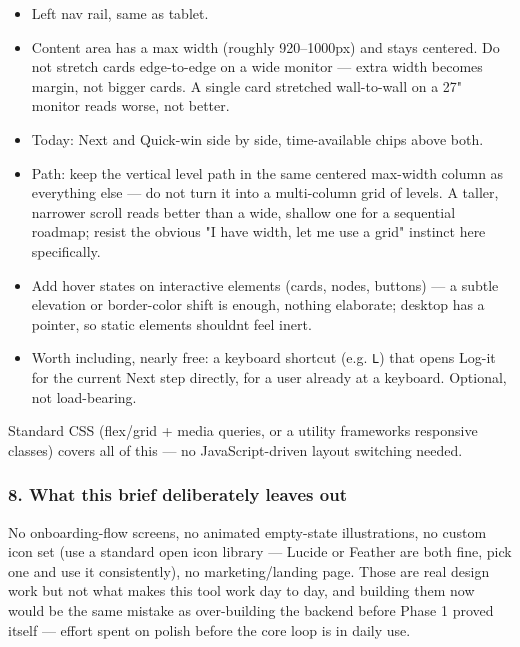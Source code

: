 \begin{itemize}
\tightlist
\item
  Left nav rail, same as tablet.
\item
  Content area has a max width (roughly 920--1000px) and stays centered.
  Do not stretch cards edge-to-edge on a wide monitor --- extra width
  becomes margin, not bigger cards. A single card stretched wall-to-wall
  on a 27" monitor reads worse, not better.
\item
  Today: Next and Quick-win side by side, time-available chips above
  both.
\item
  Path: keep the vertical level path in the same centered max-width
  column as everything else --- do not turn it into a multi-column grid
  of levels. A taller, narrower scroll reads better than a wide, shallow
  one for a sequential roadmap; resist the obvious "I have width, let me
  use a grid" instinct here specifically.
\item
  Add hover states on interactive elements (cards, nodes, buttons) --- a
  subtle elevation or border-color shift is enough, nothing elaborate;
  desktop has a pointer, so static elements shouldn\textquotesingle t
  feel inert.
\item
  Worth including, nearly free: a keyboard shortcut (e.g. \texttt{L})
  that opens Log-it for the current Next step directly, for a user
  already at a keyboard. Optional, not load-bearing.
\end{itemize}

Standard CSS (flex/grid + media queries, or a utility
framework\textquotesingle s responsive classes) covers all of this ---
no JavaScript-driven layout switching needed.

\hypertarget{ui-ux-spec-8-what-this-brief-deliberately-leaves-out}{%
\subsubsection{8. What this brief deliberately leaves
out}\label{ui-ux-spec-8-what-this-brief-deliberately-leaves-out}}

No onboarding-flow screens, no animated empty-state illustrations, no
custom icon set (use a standard open icon library --- Lucide or Feather
are both fine, pick one and use it consistently), no marketing/landing
page. Those are real design work but not what makes this tool work day
to day, and building them now would be the same mistake as over-building
the backend before Phase 1 proved itself --- effort spent on polish
before the core loop is in daily use.


